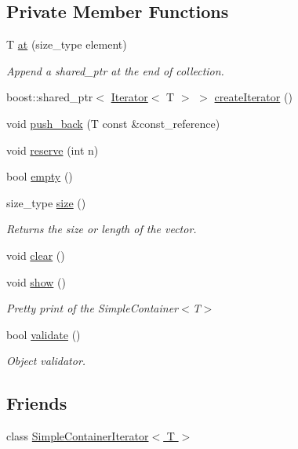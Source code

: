 \subsection*{Private Member Functions}
\begin{DoxyCompactItemize}
\item 
T \hyperlink{class_simple_container_a2e8f56f3af1e0ffb1fcd54d05d82c477}{at} (size\_\-type element)
\begin{DoxyCompactList}\small\item\em Append a shared\_\-ptr at the end of collection. \end{DoxyCompactList}\item 
boost::shared\_\-ptr$<$ \hyperlink{class_iterator}{Iterator}$<$ T $>$ $>$ \hyperlink{class_simple_container_ab7593f37ea162a6d6408f1dac1f7ae41}{createIterator} ()
\item 
void \hyperlink{class_simple_container_a53466966297b3f0a707e025b3721004a}{push\_\-back} (T const \&const\_\-reference)
\item 
void \hyperlink{class_simple_container_a4bca44e6a9cef9d57627218c0a180d8a}{reserve} (int n)
\item 
bool \hyperlink{class_simple_container_ac2966f33796f69c290a84361a578ed08}{empty} ()
\item 
size\_\-type \hyperlink{class_simple_container_a2fdb3580e1728e6e2ba6ef77c0bce63e}{size} ()
\begin{DoxyCompactList}\small\item\em Returns the size or length of the vector. \end{DoxyCompactList}\item 
void \hyperlink{class_simple_container_ae3ee6cb18f1dd33ab5de4f9854ce245f}{clear} ()
\item 
void \hyperlink{class_simple_container_af4d591e2c3a44ae016e01e3d07d1e9ac}{show} ()
\begin{DoxyCompactList}\small\item\em Pretty print of the SimpleContainer$<$T$>$ \end{DoxyCompactList}\item 
bool \hyperlink{class_simple_container_ac7cae8eaac2dc0a69138b65f679bd16a}{validate} ()
\begin{DoxyCompactList}\small\item\em Object validator. \end{DoxyCompactList}\end{DoxyCompactItemize}
\subsection*{Friends}
\begin{DoxyCompactItemize}
\item 
class \hyperlink{class_simple_container_a9abe836547cca50b94869af58a0901f7}{SimpleContainerIterator$<$ T $>$}
\end{DoxyCompactItemize}


